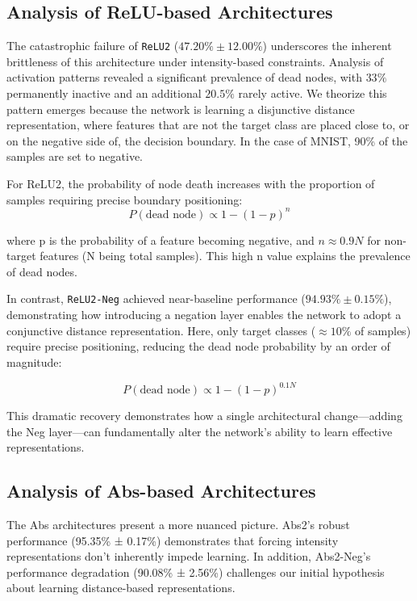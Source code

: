 \subsection{Analysis of ReLU-based Architectures}

The catastrophic failure of \texttt{ReLU2} ($47.20\% \pm 12.00\%$) underscores the inherent brittleness of this architecture under intensity-based constraints. Analysis of activation patterns revealed a significant prevalence of dead nodes, with $33\%$ permanently inactive and an additional $20.5\%$ rarely active. We theorize this pattern emerges because the network is learning a disjunctive distance representation, where features that are not the target class are placed close to, or on the negative side of, the decision boundary. In the case of MNIST, 90\% of the samples are set to negative. 

For ReLU2, the probability of node death increases with the proportion of samples requiring precise boundary positioning:
\begin{equation}
P(\text{dead node}) \propto 1 - (1 - p)^n
\end{equation}

where p is the probability of a feature becoming negative, and $n \approx 0.9N$ for non-target features (N being total samples). This high n value explains the prevalence of dead nodes.

In contrast, \texttt{ReLU2-Neg} achieved near-baseline performance ($94.93\% \pm 0.15\%$), demonstrating how introducing a negation layer enables the network to adopt a conjunctive distance representation. Here, only target classes ($\approx 10\%$ of samples) require precise positioning, reducing the dead node probability by an order of magnitude:

\begin{equation}
P(\text{dead node}) \propto 1 - (1 - p)^{0.1N}
\end{equation}

This dramatic recovery demonstrates how a single architectural change—adding the Neg layer—can fundamentally alter the network's ability to learn effective representations.

\subsection{Analysis of Abs-based Architectures}

The Abs architectures present a more nuanced picture. Abs2's robust performance (95.35\% ± 0.17\%) demonstrates that forcing intensity representations don't inherently impede learning. In addition, Abs2-Neg's performance degradation (90.08\% ± 2.56\%) challenges our initial hypothesis about learning distance-based representations.

